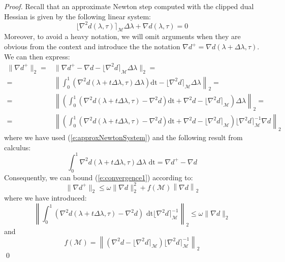 \begin{proof}
Recall that an approximate Newton step computed with the clipped dual Hessian is given by the following linear system:
\begin{equation} \label{e:approxNewtonSystem}
\lfloor \nabla^2 d(\lambda,\tau) \rceil_{\mathcal{M}} \Delta \lambda  + \nabla d(\lambda,\tau) = 0
\end{equation}
Moreover, to avoid a heavy notation, we will omit arguments when they are obvious from the context and introduce the the notation $\nabla d^+ = \nabla d(\lambda + \Delta \lambda, \tau)$. We can then express:
\begin{equation}
\begin{aligned} \label{e:convergence1}
\| \nabla d^+ \|_2 = & \| \nabla d^+ - \nabla d - \lfloor \nabla^2 d \rceil_{\mathcal{M}} \Delta \lambda \|_2 = \\
= & \left\| \int_0^1 ( \nabla^2 d(\lambda + t \Delta \lambda, \tau) \Delta \lambda ) \text{dt} -  \lfloor \nabla^2 d \rceil_{\mathcal{M}} \Delta \lambda \right\|_2 = \\
= & \left\| \left( \int_0^1 ( \nabla^2 d(\lambda + t \Delta \lambda, \tau) - \nabla^2 d ) \text{dt} + \nabla^2 d -  \lfloor \nabla^2 d \rceil_{\mathcal{M}}  \right) \Delta \lambda \right\|_2 = \\
= & \left\| \left( \int_0^1 ( \nabla^2 d(\lambda + t \Delta \lambda, \tau) - \nabla^2 d ) \text{dt} + \nabla^2 d -  \lfloor \nabla^2 d \rceil_{\mathcal{M}}  \right)  \lfloor \nabla^2 d \rceil_{\mathcal{M}}^{-1} \nabla d \right\|_2 
\end{aligned}
\end{equation}
where we have used (\ref{e:approxNewtonSystem}) and the following result from calculus:
\begin{equation}
\int_0^1 \nabla^2 d(\lambda + t \Delta \lambda, \tau)\Delta \lambda \text{ dt} = \nabla d^+ - \nabla d
\end{equation}
Consequently, we can bound (\ref{e:convergence1}) according to:
\begin{equation}
\| \nabla d^+ \|_2 \leq \omega \| \nabla d \|_2^2 + f(\mathcal{M}) \left\| \nabla d \right\|_2 
\end{equation}
where we have introduced:
\begin{equation}
\left\| \int_0^1 ( \nabla^2 d(\lambda + t \Delta \lambda, \tau) - \nabla^2 d ) \text{ dt} \lfloor \nabla^2 d \rceil_{\mathcal{M}}^{-1} \right\|_2 \leq \omega \| \nabla d \|_2
\end{equation}
and
\begin{equation}
f(\mathcal{M}) = \left\| \left( \nabla^2 d -  \lfloor \nabla^2 d \rceil_{\mathcal{M}} \right)  \lfloor \nabla^2 d \rceil_{\mathcal{M}}^{-1} \right\|_2
\end{equation}
\qed
\end{proof}
